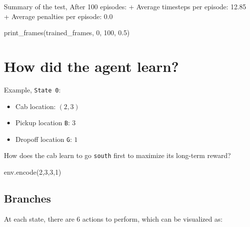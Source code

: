 \documentclass[
  letterpaper,
]{scrbook}
\newenvironment{Shaded}{\begin{snugshade}}{\end{snugshade}}
\newcommand{\DecValTok}[1]{\textcolor[rgb]{0.68,0.00,0.00}{#1}}
\newcommand{\FloatTok}[1]{\textcolor[rgb]{0.68,0.00,0.00}{#1}}
\newcommand{\NormalTok}[1]{\textcolor[rgb]{0.00,0.23,0.31}{#1}}
\providecommand{\tightlist}{%
  \setlength{\itemsep}{0pt}\setlength{\parskip}{0pt}}
\begin{document}
Summary of the test, After 100 episodes: + Average timesteps per
episode: 12.85 + Average penalties per episode: 0.0

\begin{Shaded}
\begin{Highlighting}[]
\NormalTok{print\_frames(trained\_frames, }\DecValTok{0}\NormalTok{, }\DecValTok{100}\NormalTok{, }\FloatTok{0.5}\NormalTok{)}
\end{Highlighting}
\end{Shaded}

\section*{How did the agent learn?}\label{how-did-the-agent-learn}


Example, \texttt{State\ 0}:

\begin{itemize}
\tightlist
\item
  Cab location: \((2, 3)\)
\item
  Pickup location \texttt{B}: \(3\)
\item
  Dropoff location \texttt{G}: \(1\)
\end{itemize}

How does the cab learn to go \texttt{south} first to maximize its
long-term reward?

\begin{Shaded}
\begin{Highlighting}[]
\NormalTok{env.encode(}\DecValTok{2}\NormalTok{,}\DecValTok{3}\NormalTok{,}\DecValTok{3}\NormalTok{,}\DecValTok{1}\NormalTok{)}
\end{Highlighting}
\end{Shaded}

\subsection*{Branches}\label{branches}

At each state, there are \(6\) actions to perform, which can be
visualized as:
\end{document}
